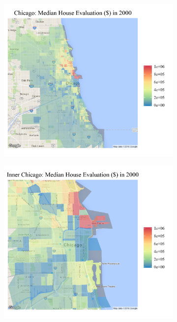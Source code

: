 \documentclass[11pt]{asaproc}
\newcommand{\1}{\mathbb{1}}
\begin{document}
\begin{figure}[h!]
\centering
\begin{subfigure}{.45\textwidth}
  \centering
\includegraphics[scale=.15]{figures/c_2000.png}
\end{subfigure}%
\begin{subfigure}{.45\textwidth}
  \centering
\includegraphics[scale=.15]{figures/c_2000_inner.png}

\end{subfigure}
\end{figure}
\end{document}
